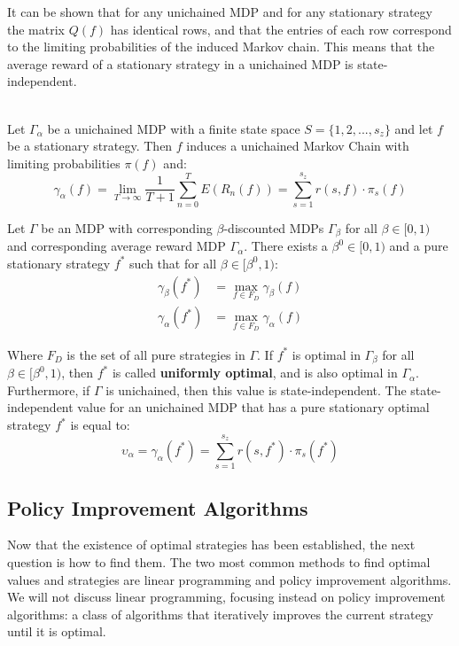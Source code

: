\documentclass[12pt]{article}
\begin{document}
\noindent
It can be shown that for any unichained MDP and for any stationary strategy the matrix $Q(f)$ has identical rows, and that the entries of each row correspond to the limiting probabilities of the induced Markov chain.
This means that the average reward of a stationary strategy in a unichained MDP is state-independent.

\noindent
\\
Let $\Gamma_\alpha$ be a unichained MDP with a finite state space $S = \{ 1, 2, ... , s_z \}$ and let $f$ be a stationary strategy.
Then $f$ induces a unichained Markov Chain with limiting probabilities $\pi(f)$ and:
\[ \gamma_\alpha(f) = \lim_{T \rightarrow \infty} \frac{1}{T + 1} \sum_{n = 0}^T E(R_n(f)) = \sum_{s = 1}^{s_z} r(s, f) \cdot \pi_s(f) \]

\noindent
Let $\Gamma$ be an MDP with corresponding $\beta$-discounted MDPs $\Gamma_\beta$ for all $\beta \in [0, 1)$ and corresponding average reward MDP $\Gamma_\alpha$.
There exists a $\beta^0 \in [0, 1)$ and a pure stationary strategy $f^*$ such that for all $\beta \in [\beta^0, 1)$:
\begin{align*}
    \gamma_\beta(f^*) &= \max_{f \in F_D} \gamma_\beta(f) \\ \gamma_\alpha(f^*) &= \max_{f \in F_D} \gamma_\alpha(f)
\end{align*}

\noindent
Where $F_D$ is the set of all pure strategies in $\Gamma$.
If $f^*$ is optimal in $\Gamma_\beta$ for all $\beta \in [\beta^0, 1)$, then $f^*$ is called \textbf{uniformly optimal}, and is also optimal in $\Gamma_\alpha$.
Furthermore, if $\Gamma$ is unichained, then this value is state-independent.
The state-independent value for an unichained MDP that has a pure stationary optimal strategy $f^*$ is equal to:
\[ \upsilon_\alpha = \gamma_\alpha(f^*) = \sum_{s = 1}^{s_z} r(s, f^*) \cdot \pi_s(f^*) \]

\subsection{Policy Improvement Algorithms}
Now that the existence of optimal strategies has been established, the next question is how to find them.
The two most common methods to find optimal values and strategies are linear programming and policy improvement algorithms.
We will not discuss linear programming, focusing instead on policy improvement algorithms: a class of algorithms that iteratively improves the current strategy until it is optimal.
\end{document}
